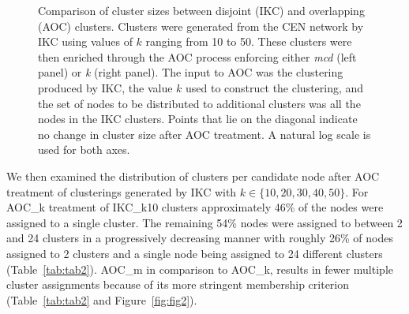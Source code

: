 \documentclass[12pt, oneside]{article}   	%
\begin{document}
\begin{figure}[H]
\begin{subfigure}[t]{0.48\textwidth}
        	\end{subfigure}
\captionsetup{width=0.9\textwidth}	
\caption{Comparison of cluster sizes between disjoint (IKC)  and overlapping (AOC) clusters. Clusters were generated from the CEN network by IKC using values of $k$ ranging from 10 to 50. These clusters were then enriched through the AOC process enforcing either \emph{mcd} (left panel) or \emph{k} (right panel). The input to AOC was the  clustering produced by IKC, the value $k$ used to construct the clustering, and the set of nodes to be distributed to additional clusters was all the nodes in the IKC clusters.  Points that lie on the diagonal indicate no change in cluster size after AOC treatment. A natural log scale is used for both axes.}
\label{fig:fig1}
\end{figure}

We then examined the distribution of clusters per candidate node after AOC treatment of clusterings generated by  IKC with $k \in \{10, 20, 30, 40, 50\}$. For AOC\_k treatment of IKC\_k10 clusters approximately 46\% of the nodes were assigned to a single cluster. The remaining 54\% nodes were assigned to between 2 and 24 clusters in a progressively decreasing manner with roughly 26\% of nodes assigned to 2 clusters and a single node being assigned to 24 different clusters (Table~\ref{tab:tab2}). AOC\_m in comparison to AOC\_k, results in fewer multiple cluster assignments because of its more stringent membership criterion (Table~\ref{tab:tab2} and Figure~\ref{fig:fig2}).
\end{document}

